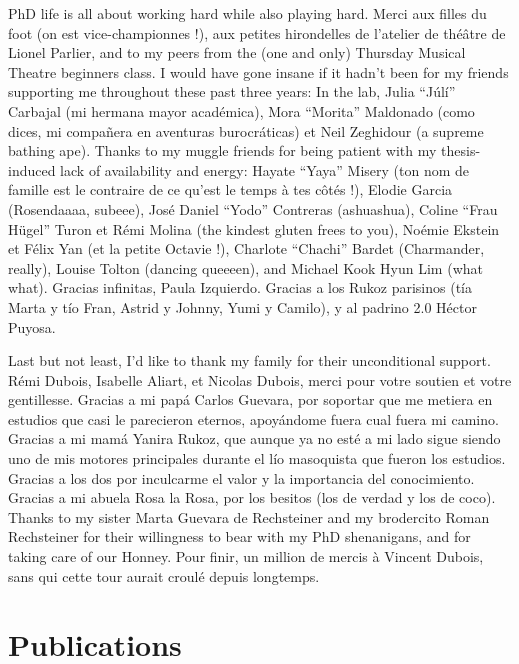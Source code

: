 \documentclass[12pt, twoside]{report}
\begin{document}
PhD life is all about working hard while also playing hard. Merci aux filles du foot (on est vice-championnes !), aux petites hirondelles de l'atelier de théâtre de Lionel Parlier, and to my peers from the (one and only) Thursday Musical Theatre beginners class. I would have gone insane if it hadn't been for my friends supporting me throughout these past three years: In the lab, Julia ``Júlí'' Carbajal (mi hermana mayor académica), Mora ``Morita'' Maldonado (como dices, mi compañera en aventuras burocráticas) et Neil Zeghidour (a supreme bathing ape).  Thanks to my muggle friends for being patient with my thesis-induced lack of availability and energy: Hayate ``Yaya'' Misery (ton nom de famille est le contraire de ce qu'est le temps à tes côtés !), Elodie Garcia (Rosendaaaa, subeee), José Daniel ``Yodo'' Contreras (ashuashua), Coline ``Frau Hügel'' Turon et Rémi Molina (the kindest gluten frees to you), Noémie Ekstein et Félix Yan (et la petite Octavie !), Charlote ``Chachi'' Bardet (Charmander, really), Louise Tolton (dancing queeeen), and Michael Kook Hyun Lim (what what). Gracias infinitas, Paula Izquierdo. Gracias a los Rukoz parisinos (tía Marta y tío Fran, Astrid y Johnny, Yumi y Camilo), y al padrino 2.0 Héctor Puyosa.   

Last but not least, I'd like to thank my family for their unconditional support. Rémi Dubois, Isabelle Aliart, et Nicolas Dubois, merci pour votre soutien et votre gentillesse. Gracias a mi papá Carlos Guevara, por soportar que me metiera en estudios que casi le parecieron eternos, apoyándome fuera cual fuera mi camino. Gracias a mi mamá Yanira Rukoz, que aunque ya no esté a mi lado sigue siendo uno de mis motores principales durante el lío masoquista que fueron los estudios. Gracias a los dos por inculcarme el valor y la importancia del conocimiento. Gracias a mi abuela Rosa la Rosa, por los besitos (los de verdad y los de coco). Thanks to my sister Marta Guevara de Rechsteiner and my brodercito Roman Rechsteiner for their willingness to bear with my PhD shenanigans, and for taking care of our Honney. Pour finir, un million de mercis à Vincent Dubois, sans qui cette tour aurait croulé depuis longtemps.              
  
\chapter*{Publications}
\end{document}
